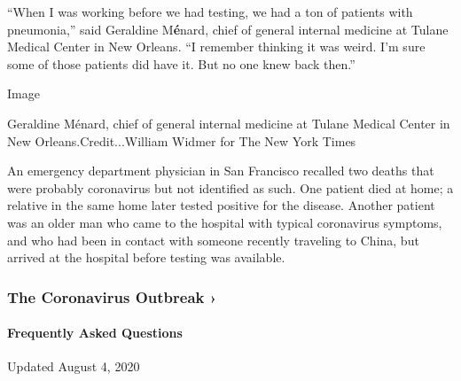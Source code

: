 ``When I was working before we had testing, we had a ton of patients
with pneumonia,'' said Geraldine M\textbf{é}nard, chief of general
internal medicine at Tulane Medical Center in New Orleans. ``I remember
thinking it was weird. I'm sure some of those patients did have it. But
no one knew back then.''

Image

Geraldine Ménard, chief of general internal medicine at Tulane Medical
Center in New Orleans.Credit...William Widmer for The New York Times

An emergency department physician in San Francisco recalled two deaths
that were probably coronavirus but not identified as such. One patient
died at home; a relative in the same home later tested positive for the
disease. Another patient was an older man who came to the hospital with
typical coronavirus symptoms, and who had been in contact with someone
recently traveling to China, but arrived at the hospital before testing
was available.

\href{https://www.nytimes.com/news-event/coronavirus?action=click\&pgtype=Article\&state=default\&region=MAIN_CONTENT_3\&context=storylines_faq}{}

\hypertarget{the-coronavirus-outbreak-}{%
\subsubsection{The Coronavirus Outbreak
›}\label{the-coronavirus-outbreak-}}

\hypertarget{frequently-asked-questions}{%
\paragraph{Frequently Asked
Questions}\label{frequently-asked-questions}}

Updated August 4, 2020


